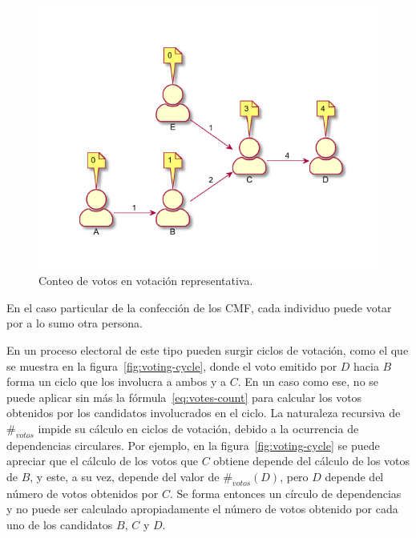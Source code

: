 \begin{figure}[h!]
    \centering
    \includegraphics{Graphics/rep-voting.pdf}
    \caption{Conteo de votos en votación representativa.}
    \label{fig:r-voting}
\end{figure}


En el caso particular de la confecci\'on de los CMF, cada individuo puede votar por a lo sumo otra persona.



En un proceso electoral de este tipo pueden surgir ciclos de votación, como el que se muestra en la figura~\ref{fig:voting-cycle}, donde el voto emitido por $D$ hacia $B$ forma un ciclo que los involucra a ambos y a $C$.  En un  caso como ese, no se puede aplicar sin m\'as la f\'ormula~\eqref{eq:votes-count} para calcular los votos obtenidos por los candidatos involucrados en el ciclo.  La naturaleza recursiva de $\#_{votos}$ impide su c\'alculo en ciclos de votaci\'on, debido a la ocurrencia de dependencias circulares. Por ejemplo, en la figura~\ref{fig:voting-cycle} se puede apreciar que el c\'alculo de los votos que $C$ obtiene depende del c\'alculo de los votos de $B$, y este, a su vez, depende del valor de $\#_{votos}(D)$, pero $D$ depende del n\'umero de votos obtenidos por $C$. Se forma entonces un c\'irculo de dependencias y no puede ser calculado apropiadamente el n\'umero de votos obtenido por cada uno de los candidatos $B$, $C$ y $D$.

